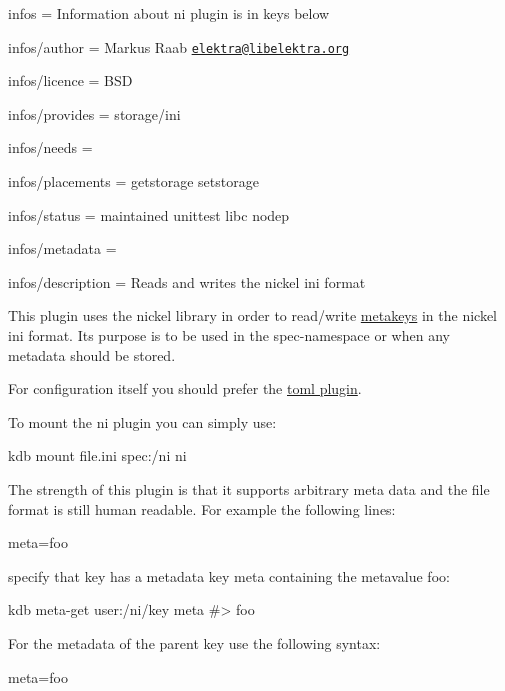 
\begin{DoxyItemize}
\item infos = Information about ni plugin is in keys below
\item infos/author = Markus Raab \href{mailto:elektra@libelektra.org}{\tt elektra@libelektra.\+org}
\item infos/licence = B\+SD
\item infos/provides = storage/ini
\item infos/needs =
\item infos/placements = getstorage setstorage
\item infos/status = maintained unittest libc nodep
\item infos/metadata =
\item infos/description = Reads and writes the nickel ini format
\end{DoxyItemize}

This plugin uses the nickel library in order to read/write \hyperlink{doc_help_elektra-metadata_md}{metakeys} in the nickel ini format. Its purpose is to be used in the {\ttfamily spec}-\/namespace or when any metadata should be stored.

For configuration itself you should prefer the \hyperlink{autotoc_md635_src_plugins_toml_README_md}{toml plugin}.

To mount the ni plugin you can simply use\+:


\begin{DoxyCode}
kdb mount file.ini spec:/ni ni
\end{DoxyCode}


The strength of this plugin is that it supports arbitrary meta data and the file format is still human readable. For example the following lines\+:


\begin{DoxyCode}
[key]
meta=foo
\end{DoxyCode}


specify that {\ttfamily key} has a metadata key {\ttfamily meta} containing the metavalue {\ttfamily foo}\+:


\begin{DoxyCode}
kdb meta-get user:/ni/key meta
#> foo
\end{DoxyCode}


For the metadata of the parent key use the following syntax\+:


\begin{DoxyCode}
[]
meta=foo
\end{DoxyCode}


